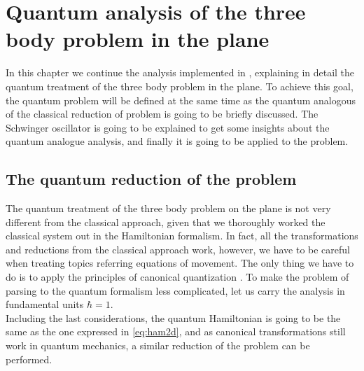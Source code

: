 \chapter{Quantum analysis of the three body problem in the plane}
In this chapter we continue the analysis implemented in \cite{alonso}, explaining in detail the quantum treatment of the three body problem in the plane. To achieve this goal, the quantum problem will be defined at the same time as the quantum analogous of the classical reduction of problem is going to be briefly discussed. The Schwinger oscillator is going to be explained to get some insights about the quantum analogue analysis, and finally it is going to be applied to the problem.\\

\section{The quantum reduction of the problem}
The quantum treatment of the three body problem on the plane is not very different from the classical approach, given that we thoroughly worked the classical system out in the Hamiltonian formalism. In fact, all the transformations and reductions from the classical approach work, however, we have to be careful when treating topics referring equations of movement.  The only thing we have to do is to apply the principles of canonical quantization \cite{Cq}. To make the problem of parsing to the quantum formalism less complicated, let us carry the analysis in fundamental units $\hbar =1$. \\

Including the last considerations, the quantum Hamiltonian is going to be the same as the one expressed in \eqref{eq:ham2d}, and as canonical transformations still work in quantum mechanics, a similar reduction of the problem can be performed.\\


